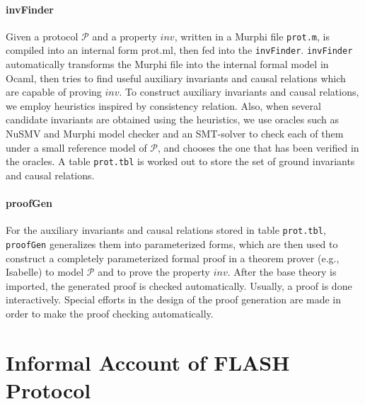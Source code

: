 \documentclass{llncs}
\begin{document}
\paragraph{invFinder}%
Given a protocol $\mathcal{P}$ and a property $inv$,  written in
a Murphi  file {\tt prot.m}, is compiled into an internal form {\sf prot.ml}, then fed into the
\texttt{invFinder}. {\tt invFinder} automatically transforms the Murphi file into the internal formal model in Ocaml, then tries to find useful auxiliary invariants and causal relations which are capable of proving $inv$. To construct auxiliary invariants and causal relations, we employ heuristics inspired by consistency relation. Also, when several candidate invariants are obtained using the heuristics, we use oracles such as NuSMV and Murphi model checker and an SMT-solver to check each of them under a small reference model of $\mathcal{P}$, and chooses the one that has been verified in the oracles. A table {\tt prot.tbl} is worked out  to store the set of ground invariants and
 causal relations.


\paragraph{proofGen} For the auxiliary invariants and causal relations stored in table {\tt prot.tbl}, {\tt proofGen} generalizes them  into  parameterized forms, which are then used to construct a completely parameterized formal proof in a theorem prover (e.g., Isabelle) to model $\mathcal{P}$ and to prove the property $inv$. After the base theory is imported, the generated proof is checked automatically.  Usually, a proof is done interactively. Special efforts in the design of the proof generation are made in order to make the proof checking automatically.




\section{Informal Account of FLASH Protocol\label{sec:informalOfFLASH}}
\end{document}
